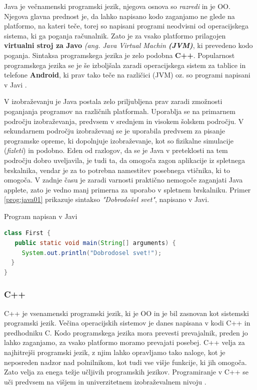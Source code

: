 Java je večnamenski programski jezik, njegova osnova so \emph{razredi}
in je OO. Njegova glavna prednost je, da lahko napisano kodo zaganjamo
ne glede na platformo, na kateri teče, torej so napisani programi
neodvisni od operacijskega sistema, ki ga poganja računalnik. Zato je
za vsako platformo prilagojen \textbf{virtualni stroj za Javo}
  \emph{(ang. Java Virtual Machin \textbf{(JVM)}}, ki prevedeno kodo
poganja. Sintaksa programskega jezika je zelo podobna
\textbf{C++}. Popularnost programskega jezika se je še izboljšala zaradi
operacijskega sistem za tablice in telefone \textbf{Android}, ki prav
tako teče na različici (JVM) oz. so programi napisani v Javi
\cite{wiki:java}.

V izobraževanju je Java postala zelo priljubljena prav zaradi
zmožnosti poganjanja programov na različnih platformah. Uporablja se
na primarnem področju izobraževanja, predvsem v srednjem in visokem
šolskem področju. V sekundarnem področju izobraževanj se je uporabila
predvsem za pisanje programske opreme, ki dopolnjuje izobraževanje,
kot so fizikalne simulacije (\emph{fizleti}) in podobno. Eden od
razlogov, da se je Java v preteklosti na tem področju dobro uveljavila,
je tudi ta, da omogoča zagon aplikacije iz spletnega brskalnika, vendar
je za to potrebna namestitev posebnega vtičnika, ki to omogoča. V
zadnje času je zaradi varnosti praktično nemogoče zaganjati Java
applete, %
zato je vedno manj primerna za uporabo v spletnem brskalniku.
Primer \ref{prog:java01} prikazuje sintakso \emph{"Dobrodošel svet"},
napisano v Javi.
\begin{examplebox}[label={prog:java01}]{Program napisan v Javi}
\begin{lstlisting}[language=Java]
class First {
   public static void main(String[] arguments) {
     System.out.println("Dobrodosel svet!");
  }
}
\end{lstlisting}
\end{examplebox}

\subsubsection{C++}
\label{sec:pj_c++}

C++ je vsenamenski programski jezik, ki je OO in je bil zasnovan kot
sistemski programski jezik. Večina operacijskih sistemov je danes
napisana v kodi C++ in predhodniku C. Kodo programskega jezika mora prevesti
prevajalnik, preden jo lahko zaganjamo, za vsako platformo moramo
prevajati posebej.  C++ velja za najhitrejši programski jezik, z njim
lahko opravljamo tako naloge, kot je neposreden nadzor nad
polnilnikom, kot tudi vse višje funkcije, ki jih omogoča. Zato velja
za enega težje učljivih programskih jezikov. Programiranje v C++ se
uči predvsem na višjem in univerzitetnem izobraževalnem nivoju \cite{wiki:cpp}.

